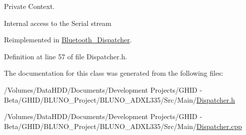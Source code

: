 \-Private \-Context. 

\-Internal access to the \-Serial stream 

\-Reimplemented in \hyperlink{class_bluetooth___dispatcher_a9b30fd1951f4e064a707ec75b941d18e}{\-Bluetooth\-\_\-\-Dispatcher}.



\-Definition at line 57 of file \-Dispatcher.\-h.



\-The documentation for this class was generated from the following files\-:\begin{DoxyCompactItemize}
\item 
/\-Volumes/\-Data\-H\-D\-D/\-Documents/\-Development Projects/\-G\-H\-I\-D -\/ Beta/\-G\-H\-I\-D/\-B\-L\-U\-N\-O\-\_\-\-Project/\-B\-L\-U\-N\-O\-\_\-\-A\-D\-X\-L335/\-Src/\-Main/\hyperlink{_dispatcher_8h}{\-Dispatcher.\-h}\item 
/\-Volumes/\-Data\-H\-D\-D/\-Documents/\-Development Projects/\-G\-H\-I\-D -\/ Beta/\-G\-H\-I\-D/\-B\-L\-U\-N\-O\-\_\-\-Project/\-B\-L\-U\-N\-O\-\_\-\-A\-D\-X\-L335/\-Src/\-Main/\hyperlink{_dispatcher_8cpp}{\-Dispatcher.\-cpp}\end{DoxyCompactItemize}
